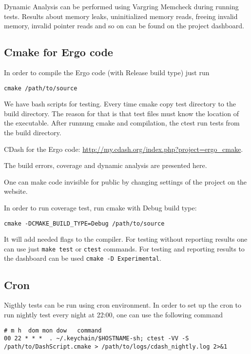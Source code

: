 \documentclass[a4paper,10pt]{article}
\begin{document}
Dynamic Analysis can be performed using Vargring Memcheck during running tests. Results about memory leaks, uninitialized memory reads, freeing invalid memory, invalid pointer reads and so on can be found on the project dashboard.

\subsection{Cmake for Ergo code}

In order to compile the Ergo code (with Release build type) just run
\begin{verbatim}
cmake /path/to/source
\end{verbatim}




We have bash scripts for testing. Every time cmake copy test directory to the build directory. The reason for that is that test files must know the location of the executable.
After runnung cmake and compilation, the ctest run tests from the build directory.

CDash for the Ergo code: \url{http://my.cdash.org/index.php?project=ergo_cmake}.

The build errors, coverage and dynamic analysis are presented here.  

One can make code invisible for public by changing settings of the project on the website.


In order to run coverage test, run cmake with Debug build type: 
\begin{verbatim}
cmake -DCMAKE_BUILD_TYPE=Debug /path/to/source
\end{verbatim}
It will add needed flags to the compiler.
For testing without reporting results one can use just \texttt{make test} or \texttt{ctest} commands.
For testing and reporting results to the dashboard can be used \texttt{cmake -D Experimental}.


\subsection{Cron}

Nigthly tests can be run using cron environment. In order to set up the cron to run nightly test every night at 22:00, one can use the following command
\begin{verbatim}
# m h  dom mon dow   command
00 22 * * *  . ~/.keychain/$HOSTNAME-sh; ctest -VV -S /path/to/DashScript.cmake > /path/to/logs/cdash_nightly.log 2>&1
\end{verbatim}
\end{document}
